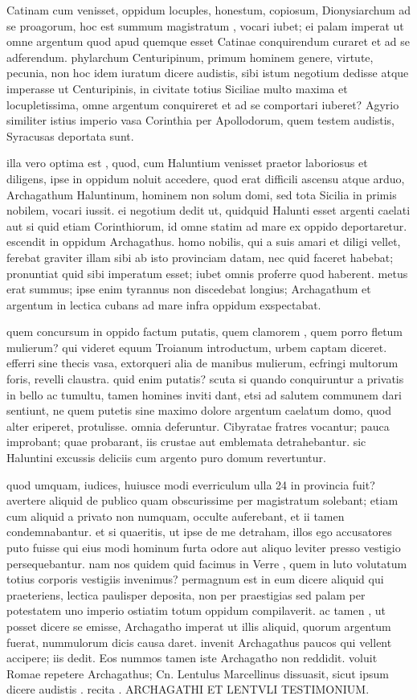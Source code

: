  Catinam cum venisset, oppidum locuples, honestum, copiosum, Dionysiarchum ad se proagorum, hoc est summum magistratum , vocari iubet; ei palam imperat ut omne argentum quod apud quemque esset Catinae conquirendum curaret et ad se adferendum. phylarchum Centuripinum, primum hominem genere, virtute, pecunia, non hoc idem iuratum dicere audistis, sibi istum negotium dedisse atque imperasse ut Centuripinis, in civitate totius Siciliae multo maxima et locupletissima, omne argentum conquireret et ad se comportari iuberet? Agyrio similiter istius imperio vasa Corinthia per Apollodorum, quem testem audistis, Syracusas deportata sunt.

 illa vero optima est , quod, cum Haluntium venisset praetor laboriosus et diligens, ipse in oppidum noluit accedere, quod erat difficili ascensu atque arduo, Archagathum Haluntinum, hominem non solum domi, sed tota Sicilia in primis nobilem, vocari iussit. ei negotium dedit ut, quidquid Halunti esset argenti caelati aut si quid etiam Corinthiorum, id omne statim ad mare ex oppido deportaretur. escendit in oppidum Archagathus. homo nobilis, qui a suis amari et diligi vellet, ferebat graviter illam sibi ab isto provinciam datam, nec quid faceret habebat; pronuntiat quid sibi imperatum esset; iubet omnis proferre quod haberent. metus erat summus; ipse enim tyrannus non discedebat longius; Archagathum et argentum in lectica cubans ad mare infra oppidum exspectabat.

 quem concursum in oppido factum putatis, quem clamorem , quem porro fletum mulierum? qui videret equum Troianum introductum, urbem captam diceret. efferri sine thecis vasa, extorqueri alia de manibus mulierum, ecfringi multorum foris, revelli claustra. quid enim putatis? scuta si quando conquiruntur a privatis in bello ac tumultu, tamen homines inviti dant, etsi ad salutem communem dari sentiunt, ne quem putetis sine maximo dolore argentum caelatum domo, quod alter eriperet, protulisse. omnia deferuntur. Cibyratae fratres vocantur; pauca improbant; quae probarant, iis crustae aut emblemata detrahebantur. sic Haluntini excussis deliciis cum argento puro domum revertuntur.

 quod umquam, iudices, huiusce modi everriculum ulla 24 in provincia fuit? avertere aliquid de publico quam obscurissime per magistratum solebant; etiam cum aliquid a privato non numquam, occulte auferebant, et ii tamen condemnabantur. et si quaeritis, ut ipse de me detraham, illos ego accusatores puto fuisse qui eius modi hominum furta odore aut aliquo leviter presso vestigio persequebantur. nam nos quidem quid facimus in Verre , quem in luto volutatum totius corporis vestigiis invenimus? permagnum est in eum dicere aliquid qui praeteriens, lectica paulisper deposita, non per praestigias sed palam per potestatem uno imperio ostiatim totum oppidum compilaverit. ac tamen , ut posset dicere se emisse, Archagatho imperat ut illis aliquid, quorum argentum fuerat, nummulorum dicis causa daret. invenit Archagathus paucos qui vellent accipere; iis dedit. Eos nummos tamen iste Archagatho non reddidit. voluit Romae repetere Archagathus; Cn. Lentulus Marcellinus dissuasit, sicut ipsum dicere audistis . recita . ARCHAGATHI ET LENTVLI TESTIMONIUM.

